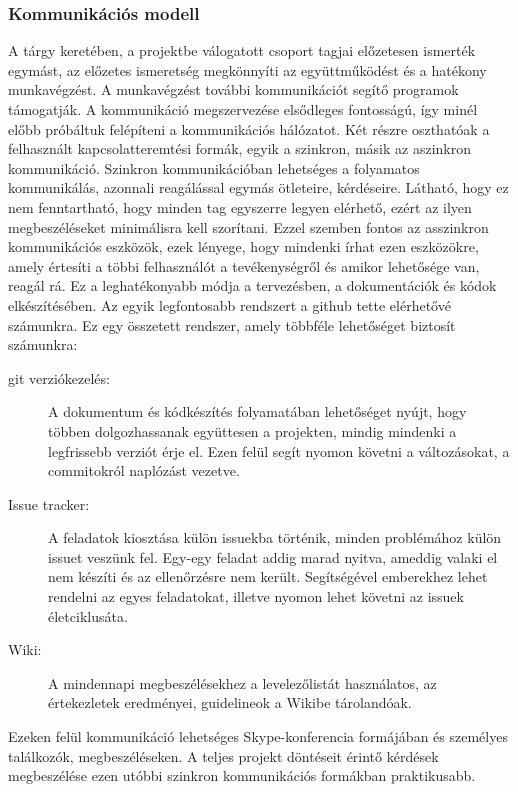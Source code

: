     \subsubsection{Kommunikációs modell}

	A tárgy keretében, a projektbe válogatott csoport tagjai előzetesen ismerték egymást, az előzetes ismeretség megkönnyíti az együttműködést és a hatékony munkavégzést. A munkavégzést további kommunikációt segítő programok támogatják.
	A kommunikáció megszervezése elsődleges fontosságú, így minél előbb próbáltuk felépíteni a kommunikációs hálózatot. Két részre oszthatóak a felhasznált kapcsolatteremtési formák, egyik a szinkron, másik az aszinkron kommunikáció. Szinkron kommunikációban lehetséges a folyamatos kommunikálás, azonnali reagálással egymás ötleteire, kérdéseire. Látható, hogy ez nem fenntartható, hogy minden tag egyszerre legyen elérhető, ezért az ilyen megbeszéléseket minimálisra kell szorítani. Ezzel szemben fontos az asszinkron kommunikációs eszközök, ezek lényege, hogy mindenki írhat ezen eszközökre, amely értesíti a többi felhasználót a tevékenységről és amikor lehetősége van, reagál rá. Ez a leghatékonyabb módja a tervezésben, a dokumentációk és kódok elkészítésében.
	Az egyik legfontosabb rendszert a github tette elérhetővé számunkra. Ez egy összetett rendszer, amely többféle lehetőséget biztosít számunkra:
	\begin{description}
		\item[git verziókezelés:]
			A dokumentum és kódkészítés folyamatában lehetőséget nyújt, hogy többen dolgozhassanak együttesen a projekten, mindig mindenki a legfrissebb verziót érje el. Ezen felül segít nyomon követni a változásokat, a commitokról naplózást vezetve.
		\item[Issue tracker:]
			A feladatok kiosztása külön issuekba történik, minden problémához külön issuet veszünk fel. Egy-egy feladat addig marad nyitva, ameddig valaki el nem készíti és az ellenőrzésre nem került. Segítségével emberekhez lehet rendelni az egyes feladatokat, illetve nyomon lehet követni az issuek életciklusáta.
		\item[Wiki:]
			A mindennapi megbeszélésekhez a levelezőlistát használatos, az értekezletek eredményei, guidelineok a Wikibe tárolandóak.
	\end{description}
	Ezeken felül kommunikáció lehetséges Skype-konferencia formájában és személyes találkozók, megbeszéléseken. A teljes projekt döntéseit érintő kérdések megbeszélése ezen utóbbi szinkron kommunikációs formákban praktikusabb.

